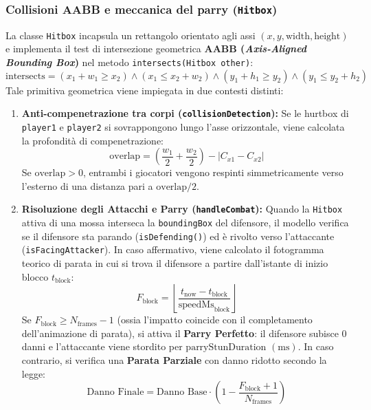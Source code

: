 \documentclass[11pt, a4paper]{article}
\begin{document}
	\subsubsection{Collisioni AABB e meccanica del parry (\texttt{Hitbox})}
	La classe \texttt{Hitbox} incapsula un rettangolo orientato agli assi $(x, y, \text{width}, \text{height})$ e implementa il test di intersezione geometrica \textbf{AABB (\emph{Axis-Aligned Bounding Box})} nel metodo \texttt{intersects(Hitbox other)}:
	\begin{equation}
		\text{intersects} = (x_1 + w_1 \ge x_2) \land (x_1 \le x_2 + w_2) \land (y_1 + h_1 \ge y_2) \land (y_1 \le y_2 + h_2)
	\end{equation}
	Tale primitiva geometrica viene impiegata in due contesti distinti:
	\begin{enumerate}
		\item \textbf{Anti-compenetrazione tra corpi (\texttt{collisionDetection}):} Se le hurtbox di \texttt{player1} e \texttt{player2} si sovrappongono lungo l'asse orizzontale, viene calcolata la profondità di compenetrazione:
		\begin{equation}
			\text{overlap} = \left(\frac{w_1}{2} + \frac{w_2}{2}\right) - \left|C_{x1} - C_{x2}\right|
		\end{equation}
		Se $\text{overlap} > 0$, entrambi i giocatori vengono respinti simmetricamente verso l'esterno di una distanza pari a $\text{overlap} / 2$.
		\item \textbf{Risoluzione degli Attacchi e Parry (\texttt{handleCombat}):} Quando la \texttt{Hitbox} attiva di una mossa interseca la \texttt{boundingBox} del difensore, il modello verifica se il difensore sta parando (\texttt{isDefending()}) ed è rivolto verso l'attaccante (\texttt{isFacingAttacker}). In caso affermativo, viene calcolato il fotogramma teorico di parata in cui si trova il difensore a partire dall'istante di inizio blocco $t_{\text{block}}$:
		\begin{equation}
			F_{\text{block}} = \left\lfloor \frac{t_{\text{now}} - t_{\text{block}}}{\text{speedMs}_{\text{block}}} \right\rfloor
		\end{equation}
		Se $F_{\text{block}} \ge N_{\text{frames}} - 1$ (ossia l'impatto coincide con il completamento dell'animazione di parata), si attiva il \textbf{Parry Perfetto}: il difensore subisce $0$ danni e l'attaccante viene stordito per $\text{parryStunDuration }(\text{ms})$. In caso contrario, si verifica una \textbf{Parata Parziale} con danno ridotto secondo la legge:
		\begin{equation}
			\text{Danno Finale} = \text{Danno Base} \cdot \left(1 - \frac{F_{\text{block}} + 1}{N_{\text{frames}}}\right)
		\end{equation}
	\end{enumerate}
	
\end{document}
